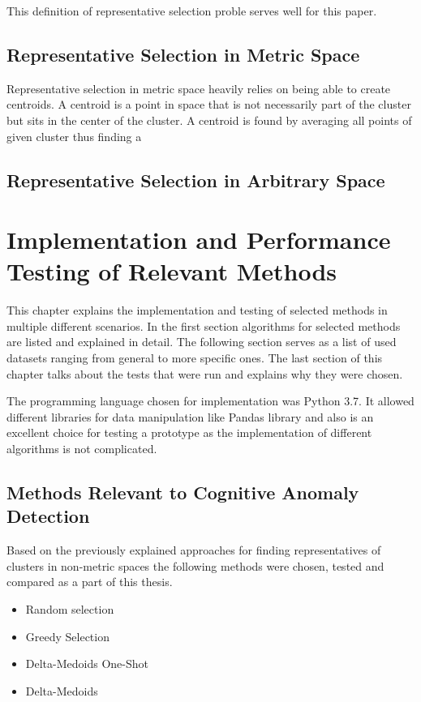 \documentclass[thesis=B,english]{FITthesis}[2012/10/20]
\begin{document}
This definition of representative selection proble serves well for this paper.


\section{Representative Selection in Metric Space}
Representative selection in metric space heavily relies on being able to create centroids.
A centroid is a point in space that is not necessarily part of the cluster but sits in the center of the cluster.
A centroid is found by averaging all points of given cluster thus finding a 

\section{Representative Selection in Arbitrary Space}


\chapter{Implementation and Performance Testing of Relevant Methods}

This chapter explains the implementation and testing of selected methods in multiple different scenarios.
In the first section algorithms for selected methods are listed and explained in detail.
The following section serves as a list of used datasets ranging from general to more specific ones.
The last section of this chapter talks about the tests that were run and explains why they were chosen.

The programming language chosen for implementation was Python 3.7.                    
It allowed different libraries for data manipulation like Pandas library and also is an excellent choice for testing a prototype as the implementation of different algorithms is not complicated.
                                                                                  
\section{Methods Relevant to Cognitive Anomaly Detection}

Based on the previously explained approaches for finding representatives of clusters in non-metric spaces the following methods were chosen, tested and compared as a part of this thesis.
\begin{itemize}
    \item Random selection
    \item Greedy Selection
    \item Delta-Medoids One-Shot
    \item Delta-Medoids 
\end{itemize}
\end{document}
